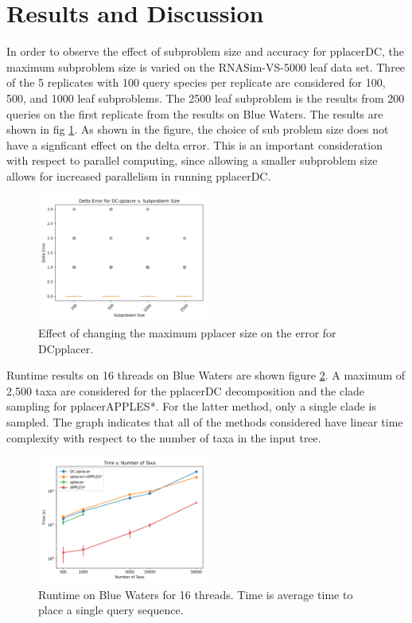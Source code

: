 \documentclass[10pt]{article}
\begin{document}
\section{Results and Discussion}

In order to observe the effect of subproblem size and accuracy for pplacerDC,
the maximum subproblem size is varied on the RNASim-VS-5000 leaf data set.
Three of the 5 replicates with 100 query species per replicate are
considered for 100, 500, and 1000 leaf subproblems. The 2500 leaf subproblem is the results from 200 queries on the first replicate from the results on Blue Waters.
The results are shown in fig \ref{fig:varying-size}.
As shown in the figure, the choice of sub problem size does not
have a signficant effect on the delta error.
This is an important consideration with respect to parallel computing,
since allowing a smaller subproblem size allows
for increased parallelism in running pplacerDC.

\begin{figure}
\centering
\includegraphics[width=0.5\textwidth]{Figs/varying-subproblem-size.png}
\caption{Effect of changing the maximum pplacer size on the error for DCpplacer.}
\label{fig:varying-size}
\end{figure}

Runtime results on 16 threads on Blue Waters are shown figure \ref{fig:timing-results}.
A maximum of 2,500 taxa are considered for the pplacerDC decomposition and the clade
sampling for pplacerAPPLES*.
For the latter method, only a single clade is sampled.
The graph indicates that all of the methods considered have linear time complexity with respect
to the number of taxa in the input tree.

\begin{figure}
\centering
\includegraphics[width=0.5\textwidth, height=0.5\textheight, keepaspectratio]{Figs/VS-timing-results-BW.png}
\caption{Runtime on Blue Waters for 16 threads. Time is average time to place a single query sequence.}
\label{fig:timing-results}
\end{figure}
\end{document}
